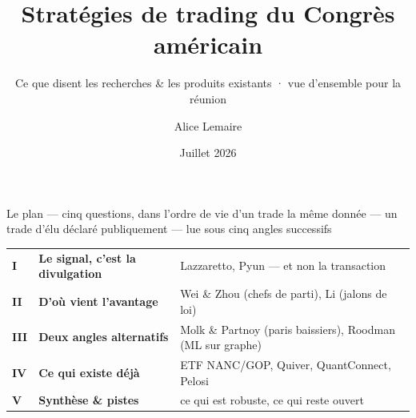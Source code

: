 \documentclass[11pt,aspectratio=169]{beamer}
\title[Copier le Congrès]{Stratégies de trading du Congrès américain}
\subtitle{Ce que disent les recherches \& les produits existants · vue d'ensemble pour la réunion}
\author[A.~Lemaire]{Alice Lemaire}
\institute[Ramify]{Document de recherche --- livrable Ramify}
\date{Juillet 2026}
\newcommand{\etape}[3]{%
  {\color{helec}\bfseries #1}\; & \textbf{#2} & {\scriptsize\color{black!60} #3}\\[0.6mm]}
\begin{document}
\begin{frame}[plain]
  \titlepage
\end{frame}


\begin{frame}{Le plan --- cinq questions, dans l'ordre de vie d'un trade}
  \centering
  \vspace{1mm}
  {\footnotesize la même donnée --- un trade d'élu déclaré publiquement --- lue sous cinq angles successifs}\\[4mm]
  {\small\setlength{\extrarowheight}{2.2pt}
  \begin{tabular}{@{}p{0.8cm}>{\raggedright\arraybackslash}p{5.0cm}>{\raggedright\arraybackslash}p{7.0cm}@{}}
    \etape{I}{Le signal, c'est la divulgation}{Lazzaretto, Pyun --- et non la transaction}
    \etape{II}{D'où vient l'avantage}{Wei \& Zhou (chefs de parti), Li (jalons de loi)}
    \etape{III}{Deux angles alternatifs}{Molk \& Partnoy (paris baissiers), Roodman (ML sur graphe)}
    \etape{IV}{Ce qui existe déjà}{ETF NANC/GOP, Quiver, QuantConnect, Pelosi}
    \etape{V}{Synthèse \& pistes}{ce qui est robuste, ce qui reste ouvert}
  \end{tabular}}
\end{frame}
\end{document}
